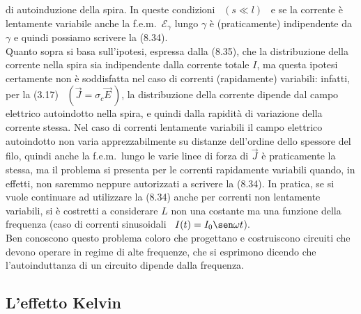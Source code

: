 di autoinduzione della spira. In queste condizioni \ $(s\ll l)$ \ e se la
corrente \`e lentamente variabile anche la f.e.m.\ $\mathcal E_\gamma$ lungo
$\gamma$ \`e (praticamente) indipendente da $\gamma$ e quindi possiamo scrivere
la (8.34).\\
Quanto sopra si basa sull'ipotesi, espressa dalla (8.35), che la distribuzione
della corrente nella spira sia indipendente dalla corrente totale $I$, ma questa
ipotesi certamente non \`e soddisfatta nel caso di correnti (rapidamente)
variabili: infatti, per la (3.17) \ $(\vec J=\sigma_c\vec E\,)$, la
distribuzione della corrente dipende dal campo elettrico autoindotto nella
spira, e quindi dalla rapidit\`a di variazione della corrente stessa. Nel caso
di correnti lentamente variabili il campo elettrico autoindotto non varia
apprezzabilmente su
distanze dell'ordine dello spessore del filo, quindi anche la f.e.m.\ lungo le
varie linee di forza di $\vec J$ \`e praticamente la stessa, ma il problema si
presenta per le correnti rapidamente variabili quando, in effetti, non saremmo
neppure autorizzati a scrivere la (8.34). In pratica, se si vuole continuare ad
utilizzare la (8.34) anche per correnti non lentamente variabili, si \`e
costretti a considerare $L$ non una costante ma una funzione della frequenza
(caso di correnti sinusoidali \ $I(t)=I_0\sen\omega t$).\\
Ben conoscono questo problema coloro che progettano e costruiscono circuiti che
devono operare in regime di alte frequenze, che si esprimono dicendo che
l'autoinduttanza di un circuito dipende dalla frequenza.

\subsection{L'effetto Kelvin}

